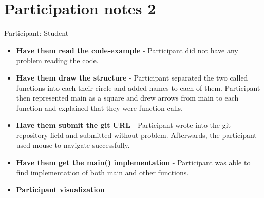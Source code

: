 \section{Participation notes 2}
Participant: Student

\begin{itemize}
    \item \textbf{Have them read the code-example} - Participant did not have any problem reading the code.
    \item \textbf{Have them draw the structure} - Participant separated the two called functions into each their circle and added names to each of them. Participant then represented main as a square and drew arrows from main to each function and explained that they were function calls.
    \item \textbf{Have them submit the git URL} - Participant wrote into the git repository field and submitted without problem. Afterwards, the participant used mouse to navigate successfully.
    \item \textbf{Have them get the main() implementation} - Participant was able to find implementation of both main and other functions.
    \item \textbf{Participant visualization} 
\end{itemize}
